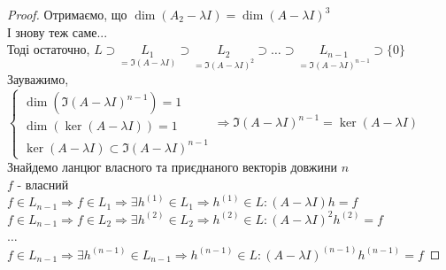 \begin{proof}
Отримаємо, що $\dim (A_2 - \lambda I) = \dim (A-\lambda I)^3$\\
І знову теж саме...
\bigskip \\
Тоді остаточно, $L \supset \underset{=\Im(A-\lambda I)}{L_1} \supset \underset{=\Im(A-\lambda I)^2}{L_2} \supset \dots \supset \underset{=\Im(A-\lambda I)^{n-1}}{L_{n-1}} \supset \{0\}$\\
Зауважимо,\\
$\begin{cases}
\dim (\Im(A-\lambda I)^{n-1}) = 1\\
\dim (\ker (A-\lambda I)) = 1\\
\ker (A-\lambda I) \subset \Im(A-\lambda I)^{n-1}
\end{cases} \Rightarrow \Im(A-\lambda I)^{n-1} = \ker(A-\lambda I)
$\\
Знайдемо ланцюг власного та приєднаного векторів довжини $n$\\
$f$ - власний\\
$f \in L_{n-1} \Rightarrow f \in L_1 \Rightarrow \exists h^{(1)} \in L_1 \Rightarrow h^{(1)} \in L: (A-\lambda I)h = f$\\
$f \in L_{n-1} \Rightarrow f \in L_2 \Rightarrow \exists h^{(2)} \in L_2 \Rightarrow h^{(2)} \in L: (A-\lambda I)^2 h^{(2)} = f$\\
$\dots$\\
$f \in L_{n-1} \Rightarrow \exists h^{(n-1)} \in L_{n-1} \Rightarrow h^{(n-1)} \in L: (A-\lambda I)^{(n-1)}h^{(n-1)} = f$
\end{proof}

